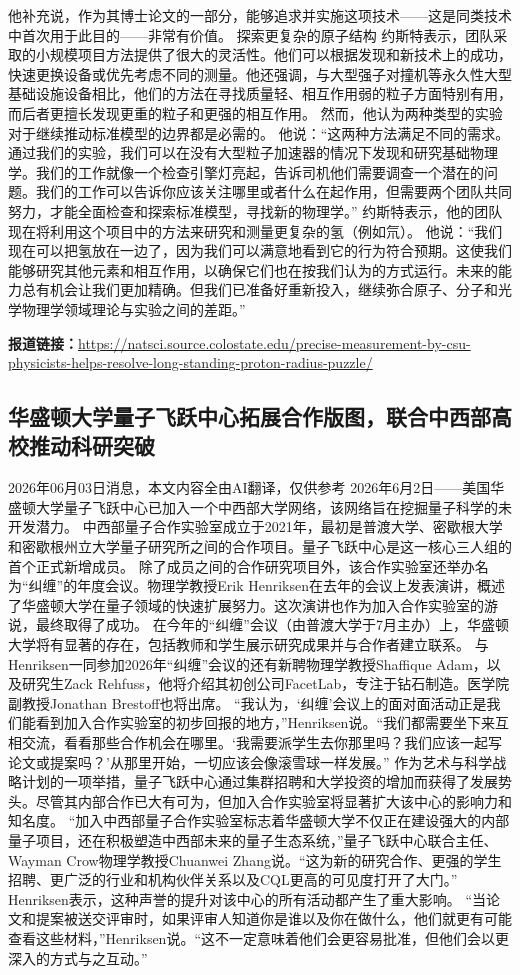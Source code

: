 \documentclass[12pt,a4paper]{ctexart}
\begin{document}
他补充说，作为其博士论文的一部分，能够追求并实施这项技术——这是同类技术中首次用于此目的——非常有价值。
探索更复杂的原子结构
约斯特表示，团队采取的小规模项目方法提供了很大的灵活性。他们可以根据发现和新技术上的成功，快速更换设备或优先考虑不同的测量。他还强调，与大型强子对撞机等永久性大型基础设施设备相比，他们的方法在寻找质量轻、相互作用弱的粒子方面特别有用，而后者更擅长发现更重的粒子和更强的相互作用。
然而，他认为两种类型的实验对于继续推动标准模型的边界都是必需的。
他说：“这两种方法满足不同的需求。通过我们的实验，我们可以在没有大型粒子加速器的情况下发现和研究基础物理学。我们的工作就像一个检查引擎灯亮起，告诉司机他们需要调查一个潜在的问题。我们的工作可以告诉你应该关注哪里或者什么在起作用，但需要两个团队共同努力，才能全面检查和探索标准模型，寻找新的物理学。”
约斯特表示，他的团队现在将利用这个项目中的方法来研究和测量更复杂的氢（例如氘）。
他说：“我们现在可以把氢放在一边了，因为我们可以满意地看到它的行为符合预期。这使我们能够研究其他元素和相互作用，以确保它们也在按我们认为的方式运行。未来的能力总有机会让我们更加精确。但我们已准备好重新投入，继续弥合原子、分子和光学物理学领域理论与实验之间的差距。”

\noindent\textbf{报道链接：}\url{https://natsci.source.colostate.edu/precise-measurement-by-csu-physicists-helps-resolve-long-standing-proton-radius-puzzle/}

\subsection{ 华盛顿大学量子飞跃中心拓展合作版图，联合中西部高校推动科研突破 }

2026年06月03日消息，本文内容全由AI翻译，仅供参考
2026年6月2日——美国华盛顿大学量子飞跃中心已加入一个中西部大学网络，该网络旨在挖掘量子科学的未开发潜力。
中西部量子合作实验室成立于2021年，最初是普渡大学、密歇根大学和密歇根州立大学量子研究所之间的合作项目。量子飞跃中心是这一核心三人组的首个正式新增成员。
除了成员之间的合作研究项目外，该合作实验室还举办名为“纠缠”的年度会议。物理学教授Erik Henriksen在去年的会议上发表演讲，概述了华盛顿大学在量子领域的快速扩展努力。这次演讲也作为加入合作实验室的游说，最终取得了成功。
在今年的“纠缠”会议（由普渡大学于7月主办）上，华盛顿大学将有显著的存在，包括教师和学生展示研究成果并与合作者建立联系。
与Henriksen一同参加2026年“纠缠”会议的还有新聘物理学教授Shaffique Adam，以及研究生Zack Rehfuss，他将介绍其初创公司FacetLab，专注于钻石制造。医学院副教授Jonathan Brestoff也将出席。
“我认为，‘纠缠’会议上的面对面活动正是我们能看到加入合作实验室的初步回报的地方，”Henriksen说。“我们都需要坐下来互相交流，看看那些合作机会在哪里。‘我需要派学生去你那里吗？我们应该一起写论文或提案吗？’从那里开始，一切应该会像滚雪球一样发展。”
作为艺术与科学战略计划的一项举措，量子飞跃中心通过集群招聘和大学投资的增加而获得了发展势头。尽管其内部合作已大有可为，但加入合作实验室将显著扩大该中心的影响力和知名度。
“加入中西部量子合作实验室标志着华盛顿大学不仅正在建设强大的内部量子项目，还在积极塑造中西部未来的量子生态系统，”量子飞跃中心联合主任、Wayman Crow物理学教授Chuanwei Zhang说。“这为新的研究合作、更强的学生招聘、更广泛的行业和机构伙伴关系以及CQL更高的可见度打开了大门。”
Henriksen表示，这种声誉的提升对该中心的所有活动都产生了重大影响。
“当论文和提案被送交评审时，如果评审人知道你是谁以及你在做什么，他们就更有可能查看这些材料，”Henriksen说。“这不一定意味着他们会更容易批准，但他们会以更深入的方式与之互动。”
\end{document}
